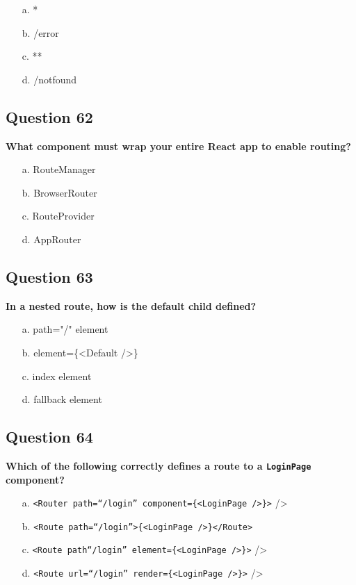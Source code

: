 \documentclass{article}
\begin{document}
\begin{itemize}
  \item[a.] *
  \item[b.] /error
  \item[c.] **
  \item[d.] /notfound
\end{itemize}

\subsection*{Question 62}
\textbf{What component must wrap your entire React app to enable routing?}

\begin{itemize}
  \item[a.] RouteManager
  \item[b.] BrowserRouter
  \item[c.] RouteProvider
  \item[d.] AppRouter
\end{itemize}

\subsection*{Question 63}
\textbf{In a nested route, how is the default child defined?}

\begin{itemize}
  \item[a.] path="/" element
  \item[b.] element=\{\textless Default /\textgreater\}
  \item[c.] index element
  \item[d.] fallback element
\end{itemize}

\subsection*{Question 64}
\textbf{Which of the following correctly defines a route to a \texttt{LoginPage} component?}

\begin{itemize}
  \item[a.] \texttt{<Router path=``/login'' component=\{<LoginPage />\}>} />
  \item[b.] \texttt{<Route path=``/login''>\{<LoginPage />\}</Route>}
  \item[c.] \texttt{<Route path``/login'' element=\{<LoginPage />\}>} />
  \item[d.] \texttt{<Route url=``/login'' render=\{<LoginPage />\}>} />
\end{itemize}
\end{document}
